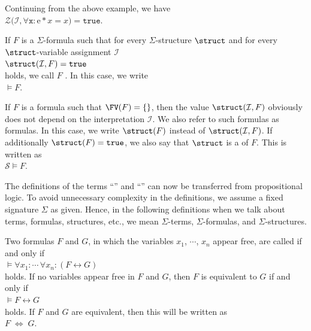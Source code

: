 \exampleEng
Continuing from the above example, we have \\[0.2cm]
\hspace*{1.3cm}  $\mathcal{Z}\bigl(\mathcal{I}, \forall \mathtt{x}: \mathrm{e} * x = x \bigr) = \mathtt{true}$.
\eox

\begin{Definition} 
    If $F$ is a $\Sigma$-formula such that for every $\Sigma$-structure $\struct$ and for every
    $\struct$-variable assignment $\mathcal{I}$ \\[0.2cm]
    \hspace*{1.3cm} $\struct(\mathcal{I}, F) = \mathtt{true}$ \\[0.2cm]
    holds, we call $F$ . In this case, we write \\[0.2cm]
    \hspace*{1.3cm} $\models F$. 
    \eox
\end{Definition}

If $F$ is a formula such that $\FV(F) = \{\}$, then the value $\struct(\mathcal{I}, F)$ 
obviously does not depend on the interpretation $\mathcal{I}$. We also refer to such formulas as 
 formulas. In this case, we write $\struct(F)$
instead of $\struct(\mathcal{I}, F)$. If additionally $\struct(F) = \mathtt{true}$, 
we also say that $\struct$ is a   of $F$.
This is written as \\[0.2cm]
\hspace*{1.3cm} $\mathcal{S} \models F$. 
\vspace{0.1cm}

The definitions of the terms ``'' and
``'' can now be transferred from propositional logic. 
To avoid unnecessary complexity in the definitions, we assume a
fixed signature $\Sigma$ as given. Hence, in the following definitions
when we talk about terms, formulas, structures, etc., we mean $\Sigma$-terms,
$\Sigma$-formulas, and $\Sigma$-structures.

\begin{Definition}[Equivalent] 
  Two formulas $F$ and $G$, in which the variables $x_1$, $\cdots$, $x_n$ appear free, are called
   if and only if  
  \\[0.2cm] 
  \hspace*{1.3cm}
  $\models \forall x_1: \cdots\, \forall x_n: (F \leftrightarrow G)$
  \\[0.2cm] 
  holds. If no variables appear free in $F$ and $G$, then $F$ is equivalent to $G$ if and only if
  \\[0.2cm]
  \hspace*{1.3cm}
  $\models F \leftrightarrow G$
  \\[0.2cm]
  holds.  If $F$ and $G$ are equivalent, then this will be written as
  \\[0.2cm]
  \hspace*{1.3cm}
  $F \;\Leftrightarrow\; G$.
  \eox
\end{Definition}

